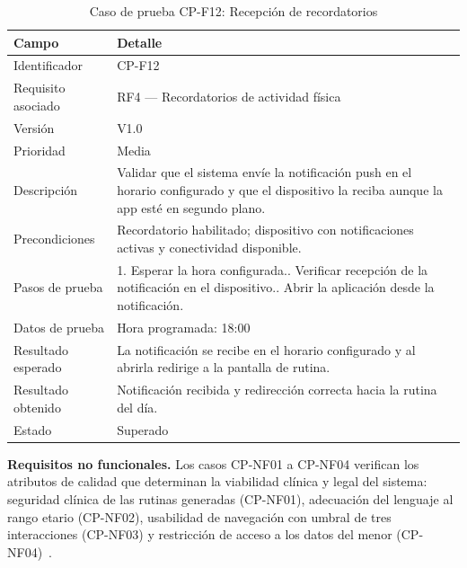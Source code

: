 				\begin{table}[H]
					\centering\small
					\caption{Caso de prueba CP-F12: Recepción de recordatorios}
					\label{tab:cpf12}
					\begin{tabular}{p{3cm}p{12.0cm}}
						\hline
						\textbf{Campo} & \textbf{Detalle}\\
						\hline
						Identificador & CP-F12\\
						Requisito asociado & RF4 --- Recordatorios de actividad física\\
						Versión & V1.0\\
						Prioridad & Media\\
						Descripción & Validar que el sistema envíe la notificación push en el horario configurado y que el dispositivo la reciba aunque la app esté en segundo plano.\\
						Precondiciones & Recordatorio habilitado; dispositivo con notificaciones activas y conectividad disponible.\\
						Pasos de prueba & 1. Esperar la hora configurada.\newline 2. Verificar recepción de la notificación en el dispositivo.\newline 3. Abrir la aplicación desde la notificación.\\
						Datos de prueba & Hora programada: 18:00\\
						Resultado esperado & La notificación se recibe en el horario configurado y al abrirla redirige a la pantalla de rutina.\\
						Resultado obtenido & Notificación recibida y redirección correcta hacia la rutina del día.\\
						Estado & Superado\\
						\hline
					\end{tabular}
				\end{table}
				\tblnote
				
				\textbf{Requisitos no funcionales.} Los casos CP-NF01 a CP-NF04 verifican los atributos de calidad que determinan la viabilidad clínica y legal del sistema: seguridad clínica de las rutinas generadas (CP-NF01), adecuación del lenguaje al rango etario (CP-NF02), usabilidad de navegación con umbral de tres interacciones (CP-NF03) y restricción de acceso a los datos del menor (CP-NF04)~\cite{LOPDP2021,GuerreroUlloa2024}.
				
